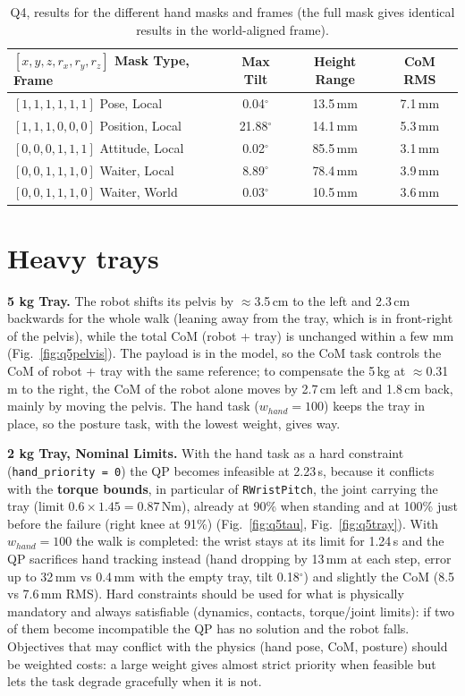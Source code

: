 \documentclass[10pt,a4paper]{article}
\newcommand{\fig}[1]{Fig.~\ref{fig:#1}}
\newcommand{\code}[1]{\texttt{#1}}
\begin{document}
\begin{table}[H]
  \begin{center}\small
    \begin{tabular}{lccc}
      \toprule
      $[x,y,z,r_x,r_y,r_z]$ Mask Type, Frame & Max Tilt      & Height Range & CoM RMS \\
      \midrule
      $[1,1,1,1,1,1]$ Pose, Local            & 0.04$^\circ$  & 13.5\,mm     & 7.1\,mm \\
      $[1,1,1,0,0,0]$ Position, Local        & 21.88$^\circ$ & 14.1\,mm     & 5.3\,mm \\
      $[0,0,0,1,1,1]$ Attitude, Local        & 0.02$^\circ$  & 85.5\,mm     & 3.1\,mm \\
      $[0,0,1,1,1,0]$ Waiter, Local          & 8.89$^\circ$  & 78.4\,mm     & 3.9\,mm \\
      $[0,0,1,1,1,0]$ Waiter, World          & 0.03$^\circ$  & 10.5\,mm     & 3.6\,mm \\
      \bottomrule
    \end{tabular}
  \end{center}
  \caption{Q4, results for the different hand masks and frames (the full mask gives identical results in the world-aligned frame).}
  \label{table:Q4}
\end{table}
\section{Heavy trays}
\textbf{5 kg Tray.} The robot shifts its pelvis by $\approx$3.5\,cm to the left and 2.3\,cm backwards for the whole walk (leaning away from the tray, which is in front-right of the pelvis), while the total CoM (robot + tray) is unchanged within a few mm (\fig{q5pelvis}). The payload is in the model, so the CoM task controls the CoM of robot + tray with the same reference; to compensate the 5\,kg at $\approx$0.31\,m to the right, the CoM of the robot alone moves by 2.7\,cm left and 1.8\,cm back, mainly by moving the pelvis. The hand task ($w_{hand}=100$) keeps the tray in place, so the posture task, with the lowest weight, gives way.

\textbf{2 kg Tray, Nominal Limits.} With the hand task as a hard constraint (\code{hand\_priority = 0}) the QP becomes infeasible at 2.23\,s, because it conflicts with the \textbf{torque bounds}, in particular of \code{RWristPitch}, the joint carrying the tray (limit $0.6\times1.45=0.87$\,Nm), already at 90\% when standing and at 100\% just before the failure (right knee at 91\%) (\fig{q5tau}, \fig{q5tray}). With $w_{hand}=100$ the walk is completed: the wrist stays at its limit for 1.24\,s and the QP sacrifices hand tracking instead (hand dropping by 13\,mm at each step, error up to 32\,mm vs 0.4\,mm with the empty tray, tilt 0.18$^\circ$) and slightly the CoM (8.5 vs 7.6\,mm RMS). Hard constraints should be used for what is physically mandatory and always satisfiable (dynamics, contacts, torque/joint limits): if two of them become incompatible the QP has no solution and the robot falls. Objectives that may conflict with the physics (hand pose, CoM, posture) should be weighted costs: a large weight gives almost strict priority when feasible but lets the task degrade gracefully when it is not.
\end{document}
